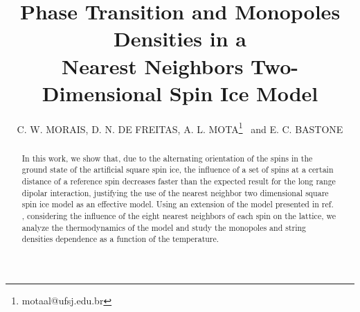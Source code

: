 \documentclass[aps,showkeys,groupedaddress]{revtex4}
\begin{document}

%
%

\title{Phase Transition and Monopoles Densities in a\\
Nearest Neighbors Two-Dimensional Spin Ice Model}

\author{C. W. MORAIS, D. N. DE FREITAS, A. L. MOTA\footnote{motaal@ufsj.edu.br}  ~and E. C. BASTONE}





\begin{abstract}
In this work, we show that, due to the alternating orientation of the spins in the ground state of the artificial square spin ice, the influence of a set of spins at a certain distance of a reference spin decreases faster than the expected result for the long range dipolar interaction, justifying the use of the nearest neighbor two dimensional square spin ice model \cite{Xie2015} as an effective model. Using an extension of the model presented in ref. \cite{Xie2015}, considering the influence of the eight nearest neighbors of each spin on the lattice, we analyze the thermodynamics of the model and study the monopoles and string densities dependence as a function of the temperature.
\end{abstract}
\end{document}
